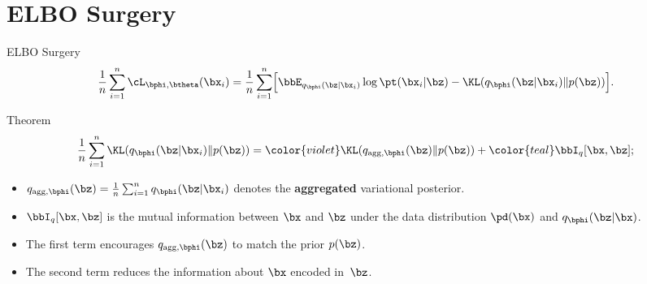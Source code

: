 \documentclass{beamer}
\begin{document}
\section{ELBO Surgery}
\begin{frame}{ELBO Surgery}
	\vspace{-0.3cm}
	\[
	    \frac{1}{n} \sum_{i=1}^n \cL_{\bphi, \btheta}(\bx_i) = \frac{1}{n} \sum_{i=1}^n \Bigl[ \bbE_{q_{\bphi}(\bz| \bx_i)} \log \pt(\bx_i | \bz) - \KL(q_{\bphi}(\bz| \bx_i) \| p(\bz)) \Bigr].
	\]
    \eqpause
	\vspace{-0.3cm}
	\begin{block}{Theorem}
		\vspace{-0.5cm}
		\[
		    \frac{1}{n} \sum_{i=1}^n \KL(q_{\bphi}(\bz| \bx_i) \| p(\bz)) = {\color{violet} \KL(q_{\text{agg}, \bphi}(\bz) \| p(\bz))} + {\color{teal}\bbI_{q} [\bx, \bz]};
		\]
        \eqpause
		\vspace{-0.5cm}
		\begin{itemize}
			\item $q_{\text{agg}, \bphi}(\bz) = \frac{1}{n} \sum_{i=1}^n q_{\bphi}(\bz| \bx_i)$ denotes the \textbf{aggregated} variational posterior.
			\item $\bbI_{q} [\bx, \bz]$ is the mutual information between $\bx$ and $\bz$ under the data distribution $\pd(\bx)$ and $q_{\bphi}(\bz| \bx)$.
			\item  {\color{violet} The first term} encourages $q_{\text{agg}, \bphi}(\bz)$ to match the prior $p(\bz)$.
			\item {\color{teal} The second term} reduces the information about $\bx$ encoded in~$\bz$.
		\end{itemize}
	\end{block}
\end{frame}
\end{document}

